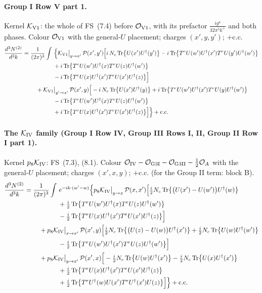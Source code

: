 \documentclass[10pt]{article}
\numberwithin{equation}{section}
\newcommand{\OO}{\mathcal O}
\newcommand{\KK}{\mathcal K}
\newcommand{\PP}{\mathcal P}
\newcommand{\pre}{\frac{1}{(2\pi)^3}}
\newcommand{\phw}{e^{-ik\cdot(w'-w)}}
\begin{document}
\paragraph{Group I Row V part 1.} Kernel $\KK_{\rm V1}$: the whole of FS~(7.4) before $\OO_{\rm V1}$, with its prefactor $\frac{ig^4}{32\pi^5k^+}$ and both phases. Colour $\OO_{\rm V1}$ with the general-$U$ placement; charges $(x',y,y')$; $+$c.c.
\begin{align}
\frac{d^3N^{(2)}}{d^3k}={}&\pre\int\,\Big\{\KK_{\rm V1}\big|_{y\to x'}\,\PP(x',y')\Big[i\,N_c\,{\rm Tr}\big\{U(x')U^\dagger(y')\big\}-i\,{\rm Tr}\big\{T^eU(w')U^\dagger(x')T^eU(y')U^\dagger(w')\big\}\notag\\
&\qquad\qquad+i\,{\rm Tr}\big\{T^eU(w')U^\dagger(x)T^eU(z)U^\dagger(w')\big\}\notag\\
&\qquad\qquad-i\,{\rm Tr}\big\{T^eU(x)U^\dagger(x')T^eU(x')U^\dagger(z)\big\}\Big]\notag\\
&\quad+\KK_{\rm V1}\big|_{y'\to x'}\,\PP(x',y)\Big[-i\,N_c\,{\rm Tr}\big\{U(x')U^\dagger(y)\big\}+i\,{\rm Tr}\big\{T^eU(w')U^\dagger(x')T^eU(y)U^\dagger(w')\big\}\notag\\
&\qquad\qquad-i\,{\rm Tr}\big\{T^eU(w')U^\dagger(x)T^eU(z)U^\dagger(w')\big\}\notag\\
&\qquad\qquad+i\,{\rm Tr}\big\{T^eU(x)U^\dagger(x')T^eU(x')U^\dagger(z)\big\}\Big]\Big\}+{\rm c.c.}
\end{align}
\paragraph{The $\KK_{\rm IV}$ family (Group I Row IV, Group III Rows I, II, Group II Row I part 1).} Kernel $p_8\KK_{\rm IV}$: FS~(7.3), (8.1). Colour $\OO_{\rm IV}-\OO_{\rm G3I}-\OO_{\rm G3II}-\frac12\OO_A$ with the general-$U$ placement; charges $(x',x,y)$; $+$c.c. (for the Group II term: block B).
\begin{align}
\frac{d^3N^{(2)}}{d^3k}={}&\pre\int\,\phw\Big\{p_8\KK_{\rm IV}\big|_{y\to x}\,\PP(x,x')\Big[\tfrac{i}{2}N_c\,{\rm Tr}\big\{\big(U(x')-U(w')\big)U^\dagger(w)\big\}\notag\\
&\qquad\qquad+\tfrac{i}{2}\,{\rm Tr}\big\{T^eU(w')U^\dagger(x)T^eU(z)U^\dagger(w')\big\}\notag\\
&\qquad\qquad-\tfrac{i}{2}\,{\rm Tr}\big\{T^eU(x)U^\dagger(x')T^eU(x')U^\dagger(z)\big\}\Big]\notag\\
&\quad+p_8\KK_{\rm IV}\big|_{x\to x'}\,\PP(x',y)\Big[\tfrac{i}{2}N_c\,{\rm Tr}\big\{\big(U(z)-U(w)\big)U^\dagger(x')\big\}+\tfrac{i}{2}N_c\,{\rm Tr}\big\{U(w)U^\dagger(w')\big\}\notag\\
&\qquad\qquad-\tfrac{i}{2}\,{\rm Tr}\big\{T^eU(w')U^\dagger(x')T^eU(z)U^\dagger(w')\big\}\Big]\notag\\
&\quad+p_8\KK_{\rm IV}\big|_{y\to x'}\,\PP(x',x)\Big[-\tfrac{i}{2}N_c\,{\rm Tr}\big\{U(w)U^\dagger(x')\big\}-\tfrac{i}{2}N_c\,{\rm Tr}\big\{U(x)U^\dagger(x')\big\}\notag\\
&\qquad\qquad+\tfrac{i}{2}\,{\rm Tr}\big\{T^eU(x)U^\dagger(x')T^eU(x')U^\dagger(z)\big\}\notag\\
&\qquad\qquad+\tfrac{i}{2}\,{\rm Tr}\big\{T^eU^\dagger(w)U(x')T^eU^\dagger(x')U(z)\big\}\Big]\Big\}+{\rm c.c.}
\end{align}
\end{document}
